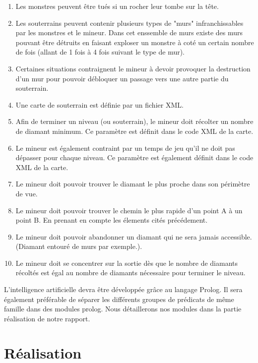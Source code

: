 \documentclass[a4paper,11pt]{article}
\begin{document}
\begin{enumerate}
			\item Les monstres peuvent \^etre tu\'es si un rocher leur tombe sur la t\^ete.
			\item Les souterrains peuvent contenir plusieurs types de "murs" infranchissables par les monstres et le mineur. Dans cet enssemble de murs existe des murs pouvant \^etre d\'etruits en faisant exploser un monstre \`a cot\'e un certain nombre de fois (allant de 1 fois \`a 4 fois suivant le type de mur).
			\item Certaines situations contraignent le mineur \`a devoir provoquer la destruction d'un mur pour pouvoir d\'ebloquer un passage vers une autre partie du souterrain.
			\item Une carte de souterrain est d\'efinie par un fichier XML.
			\item Afin de terminer un niveau (ou souterrain), le mineur doit r\'ecolter un nombre de diamant minimum. Ce param\`etre est d\'efinit dans le code XML de la carte.
			\item Le mineur est \'egalement contraint par un temps de jeu qu'il ne doit pas d\'epasser pour chaque niveau. Ce param\`etre est \'egalement d\'efinit dans le code XML de la carte.
			\item Le mineur doit pouvoir trouver le diamant le plus proche dans son p\'erim\`etre de vue.
			\item Le mineur doit pouvoir trouver le chemin le plus rapide d'un point A \`a un point B. En prenant en compte les \'elements cit\'es pr\'ec\'edement.
			\item Le mineur doit pouvoir abandonner un diamant qui ne sera jamais accessible. (Diamant entour\'e de murs par exemple.).
			\item Le mineur doit se concentrer sur la sortie d\`es que le nombre de diamants r\'ecolt\'es est \'egal au nombre de diamants n\'ecessaire pour terminer le niveau.
		\end{enumerate}
		
L'intelligence artificielle devra \^etre d\'evelopp\'ee gr\^ace au langage Prolog. Il sera \'egalement pr\'ef\'erable de s\'eparer les diff\'erents groupes de pr\'edicats de m\^eme famille dans des modules prolog. Nous d\'etaillerons nos modules dans la partie r\'ealisation de notre rapport.
	
	\newpage
	\section{R\'ealisation}
	
\end{document}
